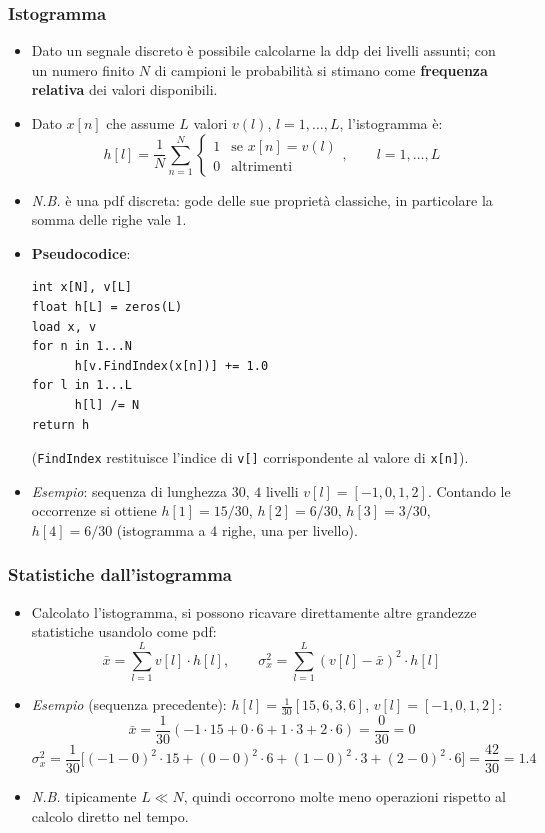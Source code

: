 \documentclass[12pt, a4paper]{article}
\begin{document}
\subsubsection{Istogramma}
\begin{itemize}
    \item Dato un segnale discreto è possibile calcolarne la ddp dei livelli assunti; con un numero finito $N$ di campioni le probabilità si stimano come \textbf{frequenza relativa} dei valori disponibili.
    \item Dato $x[n]$ che assume $L$ valori $v(l)$, $l=1,\dots,L$, l'istogramma è:
    $$h[l] = \frac1N\sum_{n=1}^{N}\begin{cases}1 & \text{se } x[n]=v(l) \\ 0 & \text{altrimenti}\end{cases}, \qquad l=1,\dots,L$$
    \item[] \textit{N.B.} è una pdf discreta: gode delle sue proprietà classiche, in particolare la somma delle righe vale $1$.
    \item \textbf{Pseudocodice}:
    \begin{verbatim}
int x[N], v[L]
float h[L] = zeros(L)
load x, v
for n in 1...N
      h[v.FindIndex(x[n])] += 1.0
for l in 1...L
      h[l] /= N
return h
    \end{verbatim}
    (\texttt{FindIndex} restituisce l'indice di \texttt{v[]} corrispondente al valore di \texttt{x[n]}).
    \item \textit{Esempio}: sequenza di lunghezza $30$, $4$ livelli $v[l]=[-1,0,1,2]$. Contando le occorrenze si ottiene $h[1]=15/30$, $h[2]=6/30$, $h[3]=3/30$, $h[4]=6/30$ (istogramma a $4$ righe, una per livello).
\end{itemize}

\subsubsection{Statistiche dall'istogramma}
\begin{itemize}
    \item Calcolato l'istogramma, si possono ricavare direttamente altre grandezze statistiche usandolo come pdf:
    $$\bar x = \sum_{l=1}^{L} v[l]\cdot h[l], \qquad \sigma_x^2 = \sum_{l=1}^{L} (v[l]-\bar x)^2\cdot h[l]$$
    \item \textit{Esempio} (sequenza precedente): $h[l]=\frac{1}{30}[15,6,3,6]$, $v[l]=[-1,0,1,2]$:
    $$\bar x = \frac{1}{30}(-1\cdot15+0\cdot6+1\cdot3+2\cdot6) = \frac{0}{30}=0$$
    $$\sigma_x^2 = \frac1{30}\Big[(-1-0)^2\cdot15+(0-0)^2\cdot6+(1-0)^2\cdot3+(2-0)^2\cdot6\Big] = \frac{42}{30}=1.4$$
    \item[] \textit{N.B.} tipicamente $L\ll N$, quindi occorrono molte meno operazioni rispetto al calcolo diretto nel tempo.
\end{itemize}
\end{document}
